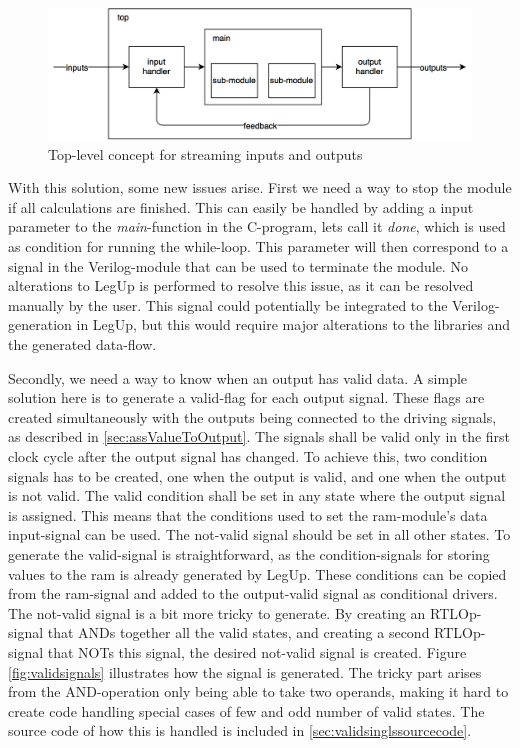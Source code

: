\begin{figure}[H]%
\centering
\includegraphics[width=\textwidth]{../figs/StreamingInputs.png}
\caption{\label{fig:steamininputstop}Top-level concept for streaming inputs and outputs}
\end{figure}

With this solution, some new issues arise. First we need a way to stop the module if all calculations are finished. This can easily be handled by adding a input parameter to the \textit{main}-function in the C-program, lets call it \textit{done}, which is used as condition for running the while-loop. This parameter will then correspond to a signal in the Verilog-module that can be used to terminate the module. No alterations to LegUp is performed to resolve this issue, as it can be resolved manually by the user. This signal could potentially be integrated to the Verilog-generation in LegUp, but this would require major alterations to the libraries and the generated data-flow.

Secondly, we need a way to know when an output has valid data. A simple solution here is to generate a valid-flag for each output signal. These flags are created simultaneously with the outputs being connected to the driving signals, as described in \ref{sec:assValueToOutput}. The signals shall be valid only in the first clock cycle after the output signal has changed. To achieve this, two condition signals has to be created, one when the output is valid, and one when the output is not valid. The valid condition shall be set in any state where the output signal is assigned. This means that the conditions used to set the \gls{ram}-module's data input-signal can be used. The not-valid signal should be set in all other states. To generate the valid-signal is straightforward, as the condition-signals for storing values to the \gls{ram} is already generated by LegUp. These conditions can be copied from the \gls{ram}-signal and added to the output-valid signal as conditional drivers. The not-valid signal is a bit more tricky to generate. By creating an RTLOp-signal that ANDs together all the valid states, and creating a second RTLOp-signal that NOTs this signal, the desired not-valid signal is created. Figure \ref{fig:validsignals} illustrates how the signal is generated. The tricky part arises from the AND-operation only being able to take two operands, making it hard to create code handling special cases of few and odd number of valid states. The source code of how this is handled is included in \cref{sec:validsinglssourcecode}.


